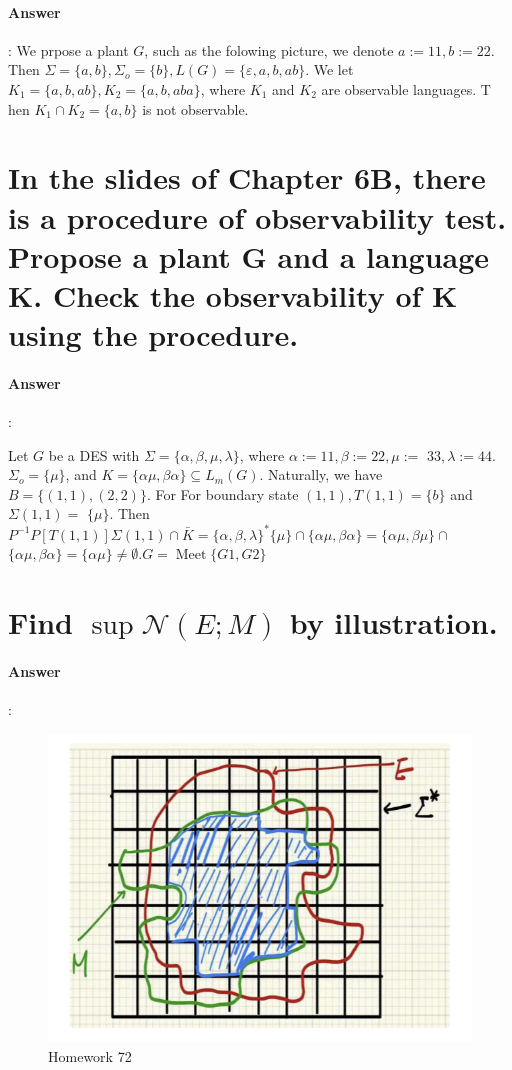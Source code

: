 \documentclass{article}
\begin{document}
\paragraph{Answer}:
We prpose a plant $G$, such as the folowing picture, we denote $a:=11, b:=22$. Then $\Sigma=\{a, b\}, \Sigma_o=\{b\}, L(G)=\{\varepsilon, a, b, a b\}$. We let $K_1=\{a, b, a b\}, K_2=\{a, b, a b a\}$, where $K_1$ and $K_2$ are observable languages. $\mathrm{T}$ hen $K_1 \cap K_2=\{a, b\}$ is not observable.

\section{In the slides of Chapter 6B, there is a procedure of observability test. Propose a plant G and a language K.
Check the observability of K using the procedure.}

\paragraph{Answer}:

Let $G$ be a DES with $\Sigma=\{\alpha, \beta, \mu, \lambda\}$, where $\alpha:=11, \beta:=22, \mu:=$ $33, \lambda:=44$. $\Sigma_o=\{\mu\}$, and $K=\{\alpha \mu, \beta \alpha\} \subseteq L_m(G)$. Naturally, we have $B=\{(1,1),(2,2)\}$. For For boundary state $(1,1), T(1,1)=\{b\}$ and $\Sigma(1,1)=$ $\{\mu\}$. Then $P^{-1} P[T(1,1)] \Sigma(1,1) \cap \bar{K}=\{\alpha, \beta, \lambda\}^*\{\mu\} \cap\{\alpha \mu, \beta \alpha\}=\{\alpha \mu, \beta \mu\} \cap$ $\{\alpha \mu, \beta \alpha\}=\{\alpha \mu\} \neq \emptyset . G=\operatorname{Meet}\{G 1, G 2\}$

\section{Find $\sup \mathcal{N}(E ; M)$  by illustration. }

\paragraph{Answer}:

\begin{figure}[h]
  \centering
  \includegraphics{assets/DES72.png}
  \caption{Homework 72}
  \label{fig:des72}
\end{figure}
\end{document}
